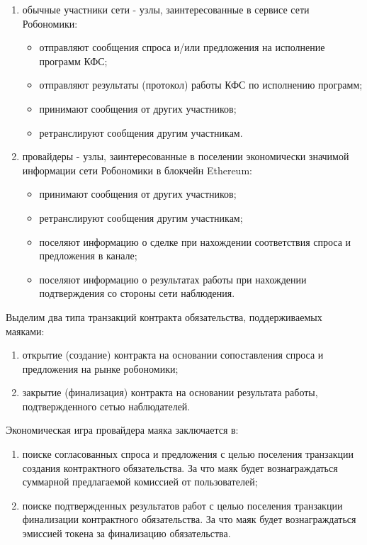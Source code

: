 \documentclass{article}
\begin{document}
\begin{enumerate}
   \item обычные участники сети - узлы, заинтересованные в сервисе сети Робономики:
   \begin{itemize}
     \item отправляют сообщения спроса и/или предложения на исполнение программ КФС;
     \item отправляют результаты (протокол) работы КФС по исполнению программ;
     \item принимают сообщения от других участников;
     \item ретранслируют сообщения другим участникам.
   \end{itemize}
   \item провайдеры - узлы, заинтересованные в поселении экономически значимой информации сети Робономики в блокчейн Ethereum:
   \begin{itemize}
     \item принимают сообщения от других участников;
     \item ретранслируют сообщения другим участникам;
     \item поселяют информацию о сделке при нахождении соответствия спроса и предложения в канале;
     \item поселяют информацию о результатах работы при нахождении подтверждения со стороны сети наблюдения.
   \end{itemize}
\end{enumerate}

Выделим два типа транзакций контракта обязательства, поддерживаемых маяками:

\begin{enumerate}
	\item открытие (создание) контракта на основании сопоставления спроса и предложения на рынке робономики;
	\item закрытие (финализация) контракта на основании результата работы, подтвержденного сетью наблюдателей.
\end{enumerate}

Экономическая игра провайдера маяка заключается в:

\begin{enumerate}
	\item поиске согласованных спроса и предложения с целью поселения транзакции создания контрактного обязательства. За что маяк будет вознаграждаться суммарной предлагаемой комиссией от пользователей;
	\item поиске подтвержденных результатов работ с целью поселения транзакции финализации контрактного обязательства. За что маяк будет вознаграждаться эмиссией токена за финализацию обязательства.
\end{enumerate}
\end{document}
